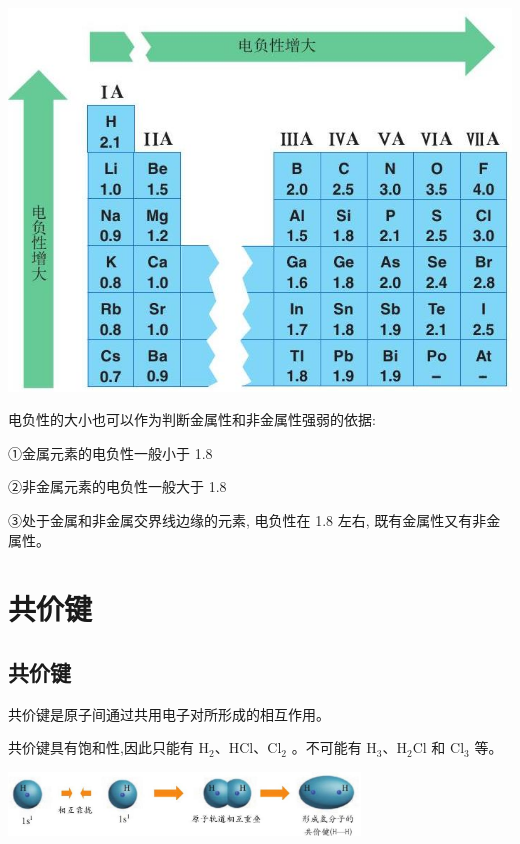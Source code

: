 \documentclass[10pt,cn]{elegantbook}
\begin{document}
\begin{center}
	\includegraphics[max width=1.0\textwidth]{image/c68.jpg}
\end{center}

电负性的大小也可以作为判断金属性和非金属性强弱的依据:

①金属元素的电负性一般小于 1.8

②非金属元素的电负性一般大于 1.8

③处于金属和非金属交界线边缘的元素, 电负性在 1.8 左右, 既有金属性又有非金属性。

\chapter{共价键}

\section{共价键}

共价键是原子间通过共用电子对所形成的相互作用。

共价键具有饱和性,因此只能有 \({\mathrm{H}}_{2}\text{、}\mathrm{{HCl}}\text{、}{\mathrm{{Cl}}}_{2}\) 。不可能有 \({\mathrm{H}}_{3}\text{、}{\mathrm{H}}_{2}\mathrm{{Cl}}\) 和 \({\mathrm{{Cl}}}_{3}\) 等。

\begin{center}
	\includegraphics[max width=0.7\textwidth]{image/c72-1.jpg}
\end{center}
\end{document}
